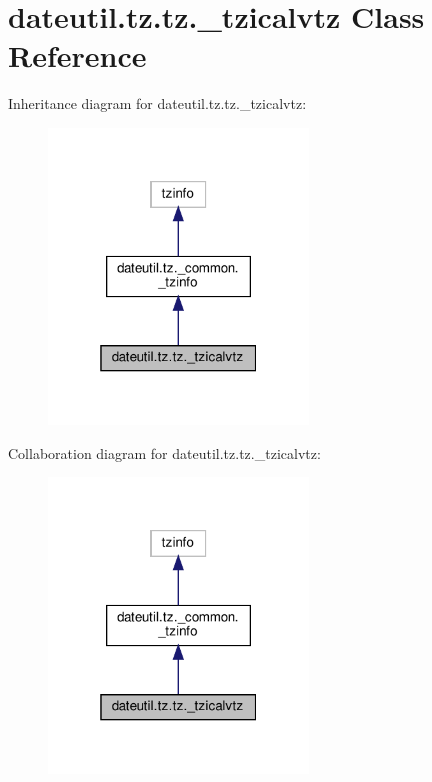 \hypertarget{classdateutil_1_1tz_1_1tz_1_1__tzicalvtz}{}\section{dateutil.\+tz.\+tz.\+\_\+tzicalvtz Class Reference}
\label{classdateutil_1_1tz_1_1tz_1_1__tzicalvtz}


Inheritance diagram for dateutil.\+tz.\+tz.\+\_\+tzicalvtz\+:
\nopagebreak
\begin{figure}[H]
\begin{center}
\leavevmode
\includegraphics[width=196pt]{classdateutil_1_1tz_1_1tz_1_1__tzicalvtz__inherit__graph}
\end{center}
\end{figure}


Collaboration diagram for dateutil.\+tz.\+tz.\+\_\+tzicalvtz\+:
\nopagebreak
\begin{figure}[H]
\begin{center}
\leavevmode
\includegraphics[width=196pt]{classdateutil_1_1tz_1_1tz_1_1__tzicalvtz__coll__graph}
\end{center}
\end{figure}

